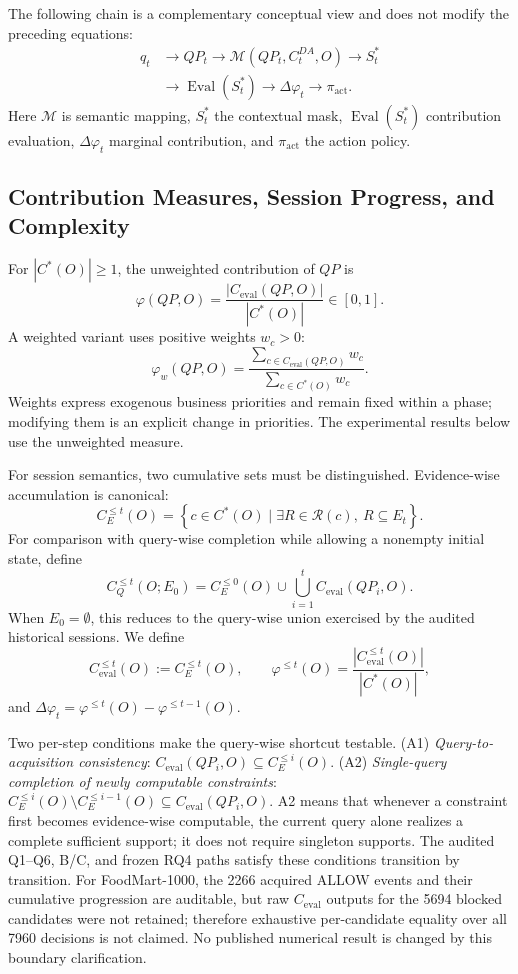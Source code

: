 \documentclass[journal]{IEEEtran}
\begin{document}
The following chain is a complementary conceptual view and does not modify the preceding equations:
\[
\begin{aligned}
q_t&\rightarrow QP_t\rightarrow \mathcal{M}(QP_t,C_t^{DA},O)\rightarrow S_t^*\\
   &\rightarrow \operatorname{Eval}(S_t^*)\rightarrow \Delta\varphi_t\rightarrow \pi_{\mathrm{act}}.
\end{aligned}
\]
Here $\mathcal M$ is semantic mapping, $S_t^*$ the contextual mask, $\operatorname{Eval}(S_t^*)$ contribution evaluation, $\Delta\varphi_t$ marginal contribution, and $\pi_{\mathrm{act}}$ the action policy.

\subsection{Contribution Measures, Session Progress, and Complexity}

For $|C^*(O)|\ge1$, the unweighted contribution of $QP$ is
\[
\varphi(QP,O)=\frac{|C_{\mathrm{eval}}(QP,O)|}{|C^*(O)|}\in[0,1].
\]
A weighted variant uses positive weights $w_c>0$:
\[
\varphi_w(QP,O)=\frac{\sum_{c\in C_{\mathrm{eval}}(QP,O)} w_c}{\sum_{c\in C^*(O)} w_c}.
\]
Weights express exogenous business priorities and remain fixed within a phase; modifying them is an explicit change in priorities. The experimental results below use the unweighted measure.

For session semantics, two cumulative sets must be distinguished. Evidence-wise accumulation is canonical:
\[
C_E^{\le t}(O)=\left\{c\in C^*(O)\mid \exists R\in\mathcal R(c),\ R\subseteq E_t\right\}.
\]
For comparison with query-wise completion while allowing a nonempty initial state, define
\[
C_Q^{\le t}(O;E_0)=C_E^{\le0}(O)\cup\bigcup_{i=1}^{t} C_{\mathrm{eval}}(QP_i,O).
\]
When $E_0=\emptyset$, this reduces to the query-wise union exercised by the audited historical sessions. We define
\[
C_{\mathrm{eval}}^{\le t}(O):=C_E^{\le t}(O),\qquad
\varphi^{\le t}(O)=\frac{|C_{\mathrm{eval}}^{\le t}(O)|}{|C^*(O)|},
\]
and $\Delta\varphi_t=\varphi^{\le t}(O)-\varphi^{\le t-1}(O)$.

Two per-step conditions make the query-wise shortcut testable. (A1) \emph{Query-to-acquisition consistency}: $C_{\mathrm{eval}}(QP_i,O)\subseteq C_E^{\le i}(O)$. (A2) \emph{Single-query completion of newly computable constraints}: $C_E^{\le i}(O)\setminus C_E^{\le i-1}(O)\subseteq C_{\mathrm{eval}}(QP_i,O)$. A2 means that whenever a constraint first becomes evidence-wise computable, the current query alone realizes a complete sufficient support; it does not require singleton supports. The audited Q1--Q6, B/C, and frozen RQ4 paths satisfy these conditions transition by transition. For FoodMart-1000, the 2266 acquired ALLOW events and their cumulative progression are auditable, but raw $C_{\mathrm{eval}}$ outputs for the 5694 blocked candidates were not retained; therefore exhaustive per-candidate equality over all 7960 decisions is not claimed. No published numerical result is changed by this boundary clarification.
\end{document}
